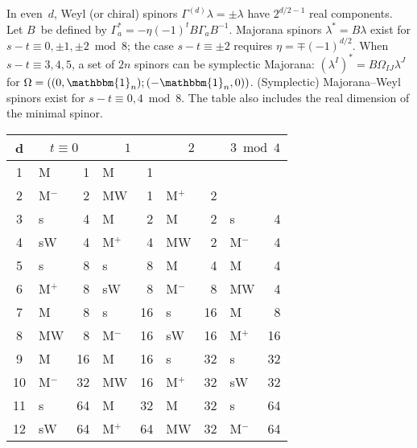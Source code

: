\documentclass[10pt,letterpaper]{article}
\begin{document}
In even~$d$, Weyl (or chiral) spinors $\Gamma^{(d)}\lambda=\pm\lambda$ have $2^{d/2-1}$ real components.
Let $B$~be defined by $\Gamma_a^*=-\eta(-1)^t B\Gamma_a B^{-1}$.
Majorana spinors $\lambda^*=B\lambda$ exist for $s-t\equiv 0,\pm 1,\pm 2\bmod{8}$;
the case $s-t\equiv\pm 2$ requires $\eta=\mp (-1)^{d/2}$.
When $s-t\equiv 3,4,5$, a set of $2n$ spinors can be symplectic Majorana: $(\lambda^I)^*=B\Omega_{IJ}\lambda^J$ for $\Omega=((0,\mathbbm{1}_n);(-\mathbbm{1}_n,0))$.
(Symplectic) Majorana--Weyl spinors exist for $s-t\equiv 0,4\bmod{8}$.
The table also includes the real dimension of the minimal spinor.
\begin{center}
\vspace{-.5\baselineskip}
\begin{tabular}{c*{4}{>{ }l@{ }r<{ }}}\toprule
d &\multicolumn{2}{c}{$t\equiv 0$} &\multicolumn{2}{c}{$1$}
& \multicolumn{2}{c}{$2$} & \multicolumn{2}{c}{$3\bmod{4}$} \\ \midrule
1 & M     & 1 & M    & 1 &       &   & &   \\
2 & M$^-$ & 2 & MW   & 1 & M$^+$ & 2 & &   \\
3 & s     & 4 & M    & 2 & M     & 2 & s     & 4 \\
4 & sW    & 4 & M$^+$& 4 & MW    & 2 & M$^-$ & 4 \\
5 & s     & 8 & s    & 8 & M     & 4 & M     & 4 \\
6 & M$^+$ & 8 & sW   & 8 & M$^-$ & 8 & MW    & 4 \\
7 & M     & 8 & s    & 16 & s    & 16 & M    & 8 \\
8 & MW    & 8 & M$^-$& 16 & sW   & 16 & M$^+$& 16 \\
9 & M     & 16& M    & 16 & s    & 32 & s    & 32 \\
10& M$^-$ & 32& MW   & 16 & M$^+$& 32 & sW   & 32 \\
11& s     & 64& M    & 32 & M    & 32 & s    & 64 \\
12& sW    & 64& M$^+$& 64 & MW   & 32 & M$^-$ & 64\\\bottomrule
\end{tabular}
\end{center}
\end{document}
